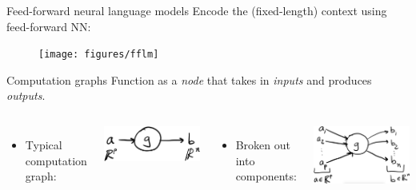 \documentclass[usenames,dvipsnames,notes]{beamer}
\begin{document}
\begin{frame}
    {Feed-forward neural language models}
    Encode the (fixed-length) context using feed-forward NN:
    \begin{figure}
        \texttt{[image: figures/fflm]}
    \end{figure}
\end{frame}

\begin{frame}
{Computation graphs}
Function as a \emph{node} that takes in \emph{inputs} and produces \emph{outputs}.

\begin{columns}[t]
\begin{itemize}
\item Typical computation graph:
\end{itemize}
\includegraphics[scale=0.05]{figures/one-fn-comp-graph}

\begin{itemize}
\item Broken out into components:
\end{itemize}
\includegraphics[scale=0.05]{figures/one-fn-comp-graph-partials}
\end{columns}
\end{frame}
\end{document}
